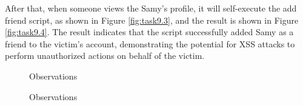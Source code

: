 \documentclass[a4paper,11pt]{article}
\begin{document}
After that, when someone views the Samy's profile, it will self-execute the add friend script, as shown in Figure \ref{fig:task9.3}, and the result is shown in Figure \ref{fig:task9.4}. The result indicates that the script successfully added Samy as a friend to the victim's account, demonstrating the potential for XSS attacks to perform unauthorized actions on behalf of the victim.
\begin{figure}[h]
    \centering
    \hfill
    \hfill
    \caption{Observations}\label{fig:task9-2}
\end{figure}


\begin{figure}[h]
    \centering
    \hfill
    \hfill
    \caption{Observations}\label{fig:task9-3}
\end{figure}
\end{document}
